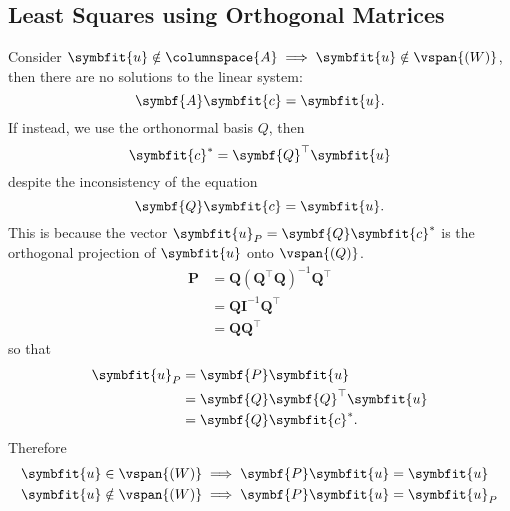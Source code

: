 \documentclass{article}
\begin{document}
\subsection{Least Squares using Orthogonal Matrices}
Consider \(\symbfit{u} \notin \columnspace{A} \implies \symbfit{u} \notin \vspan{\left( W \right)}\), then there are no solutions to the linear system:
\begin{equation*}
    \symbf{A} \symbfit{c} = \symbfit{u}.
\end{equation*}
If instead, we use the orthonormal basis \(Q\), then
\begin{equation*}
    \symbfit{c}^\ast = \symbf{Q}^\top \symbfit{u}
\end{equation*}
despite the inconsistency of the equation
\begin{equation*}
    \symbf{Q} \symbfit{c} = \symbfit{u}.
\end{equation*}
This is because the vector \(\symbfit{u}_P = \symbf{Q} \symbfit{c}^\ast\) is the orthogonal projection of \(\symbfit{u}\) onto \(\vspan{\left( Q \right)}\).
\begin{align*}
    \symbf{P} & = \symbf{Q} \left( \symbf{Q}^\top \symbf{Q} \right)^{-1} \symbf{Q}^\top \\
              & = \symbf{Q} \symbf{I}^{-1} \symbf{Q}^\top                               \\
              & = \symbf{Q} \symbf{Q}^\top
\end{align*}
so that
\begin{align*}
    \symbfit{u}_P & = \symbf{P} \symbfit{u}                \\
                  & = \symbf{Q} \symbf{Q}^\top \symbfit{u} \\
                  & = \symbf{Q} \symbfit{c}^\ast.
\end{align*}
Therefore
\begin{align*}
    \symbfit{u} \in \vspan{\left( W \right)}    & \implies \symbf{P} \symbfit{u} = \symbfit{u}   \\
    \symbfit{u} \notin \vspan{\left( W \right)} & \implies \symbf{P} \symbfit{u} = \symbfit{u}_P
\end{align*}
\end{document}
